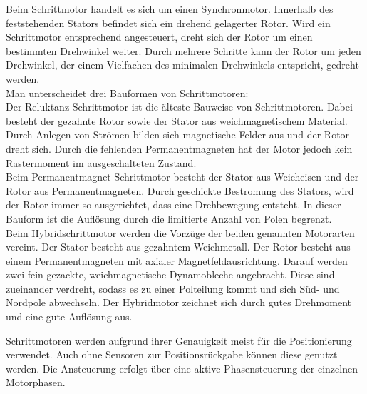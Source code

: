Beim Schrittmotor handelt es sich um einen Synchronmotor. Innerhalb des feststehenden Stators befindet sich ein drehend gelagerter Rotor. Wird ein Schrittmotor entsprechend angesteuert, dreht sich der Rotor um einen bestimmten Drehwinkel weiter. Durch mehrere Schritte kann der Rotor um jeden Drehwinkel, der einem Vielfachen des minimalen Drehwinkels entspricht, gedreht werden.\cite{Schrittmotor} \\
Man unterscheidet drei Bauformen von Schrittmotoren: \\
Der Reluktanz-Schrittmotor ist die älteste Bauweise von Schrittmotoren. Dabei besteht der gezahnte Rotor sowie der Stator aus weichmagnetischem Material. Durch Anlegen von Strömen bilden sich magnetische Felder aus und der Rotor dreht sich. Durch die fehlenden Permanentmagneten hat der Motor jedoch kein Rastermoment im ausgeschalteten Zustand.\\
Beim Permanentmagnet-Schrittmotor besteht der Stator aus Weicheisen und der Rotor aus Permanentmagneten. Durch geschickte Bestromung des Stators, wird der Rotor immer so ausgerichtet, dass eine Drehbewegung entsteht. In dieser Bauform ist die Auflösung durch die limitierte Anzahl von Polen begrenzt.\cite{Schrittmotor_Bauformen}\\
Beim Hybridschrittmotor werden die Vorzüge der beiden genannten Motorarten vereint. Der Stator besteht aus gezahntem Weichmetall. Der Rotor besteht aus einem Permanentmagneten mit axialer Magnetfeldausrichtung. Darauf werden zwei fein gezackte, weichmagnetische Dynamobleche angebracht. Diese sind zueinander verdreht, sodass es zu einer Polteilung kommt und sich Süd- und Nordpole abwechseln. Der Hybridmotor zeichnet sich durch gutes Drehmoment und eine gute Auflösung aus.\cite{Schrittmotor_Bauformen}

Schrittmotoren werden aufgrund ihrer Genauigkeit meist für die Positionierung verwendet. Auch ohne Sensoren zur Positionsrückgabe können diese genutzt werden. Die Ansteuerung erfolgt über eine aktive Phasensteuerung der einzelnen Motorphasen. 